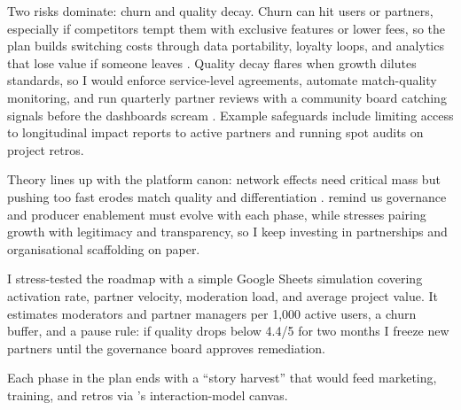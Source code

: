 Two risks dominate: churn and quality decay. Churn can hit users or partners, especially if competitors tempt them with exclusive features or lower fees, so the plan builds switching costs through data portability, loyalty loops, and analytics that lose value if someone leaves \citep{FarrellSaloner1986,ShapiroVarian1999}. Quality decay flares when growth dilutes standards, so I would enforce service-level agreements, automate match-quality monitoring, and run quarterly partner reviews with a community board catching signals before the dashboards scream \citep{Reillier2017}. Example safeguards include limiting access to longitudinal impact reports to active partners and running spot audits on project retros.

Theory lines up with the platform canon: network effects need critical mass but pushing too fast erodes match quality and differentiation \citep{Porter2008}. \citet{Choudary2016} remind us governance and producer enablement must evolve with each phase, while \citet{Srnicek2017} stresses pairing growth with legitimacy and transparency, so I keep investing in partnerships and organisational scaffolding on paper.

I stress-tested the roadmap with a simple Google Sheets simulation covering activation rate, partner velocity, moderation load, and average project value. It estimates moderators and partner managers per 1,000 active users, a churn buffer, and a pause rule: if quality drops below 4.4/5 for two months I freeze new partners until the governance board approves remediation.

Each phase in the plan ends with a ``story harvest'' that would feed marketing, training, and retros via \citet{Choudary2016}'s interaction-model canvas.
